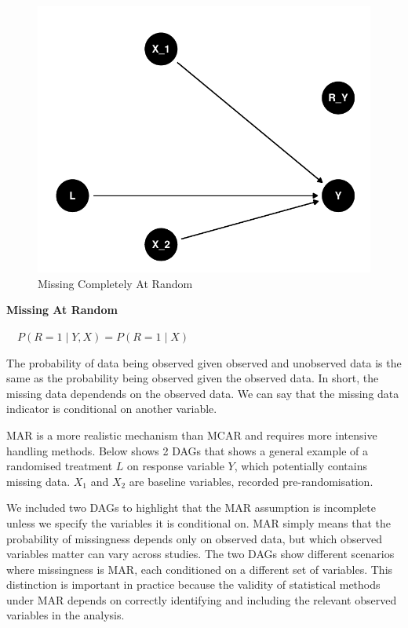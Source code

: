 \documentclass{article}
\begin{document}
\begin{figure}

{\centering \includegraphics{Final_Report_files/figure-latex/unnamed-chunk-1-1} 

}

\caption{Missing Completely At Random}\label{fig:unnamed-chunk-1}
\end{figure}

\textbf{Missing At Random}

\(\quad P(R = 1 \mid Y, X) = P(R = 1 \mid X)\)

The probability of data being observed given observed and unobserved
data is the same as the probability being observed given the observed
data. In short, the missing data dependends on the observed data. We can
say that the missing data indicator is conditional on another variable.

MAR is a more realistic mechanism than MCAR and requires more intensive
handling methods. Below shows 2 DAGs that shows a general example of a
randomised treatment \(L\) on response variable \(Y\), which potentially
contains missing data. \(X_1\) and \(X_2\) are baseline variables,
recorded pre-randomisation.

We included two DAGs to highlight that the MAR assumption is incomplete
unless we specify the variables it is conditional on. MAR simply means
that the probability of missingness depends only on observed data, but
which observed variables matter can vary across studies. The two DAGs
show different scenarios where missingness is MAR, each conditioned on a
different set of variables. This distinction is important in practice
because the validity of statistical methods under MAR depends on
correctly identifying and including the relevant observed variables in
the analysis.
\end{document}
